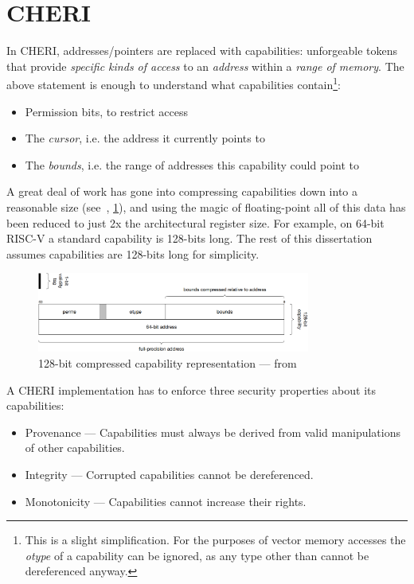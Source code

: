 \section{CHERI}\label{chap:bg:sec:cheri}
In CHERI, addresses/pointers are replaced with capabilities: unforgeable tokens that provide \emph{specific kinds of access} to an \emph{address} within a \emph{range of memory}.
The above statement is enough to understand what capabilities contain\footnote{This is a slight simplification. For the purposes of vector memory accesses the \emph{otype} of a capability can be ignored, as any type other than  cannot be dereferenced anyway.}:
\begin{itemize}
    \item Permission bits, to restrict access
    \item The \emph{cursor}, i.e. the address it currently points to
    \item The \emph{bounds}, i.e. the range of addresses this capability could point to
\end{itemize}
A great deal of work has gone into compressing capabilities down into a reasonable size (see~\cite{woodruffCHERIConcentratePractical2019}, \cref{cheri:compressedcap}), and using the magic of floating-point all of this data has been reduced to just 2x the architectural register size.
For example, on 64-bit RISC-V a standard capability is 128-bits long.
The rest of this dissertation assumes capabilities are 128-bits long for simplicity.

\begin{figure}[b]
    \centering
    \includegraphics[width=0.8\textwidth]{./figures/cheri_compressed_cap.png}
    \caption{128-bit compressed capability representation --- from~\cite{TR-941}}\label{cheri:compressedcap}
\end{figure}

A CHERI implementation has to enforce three security properties about its capabilities\cite[Section~1.2.1]{TR-951}:
\begin{itemize}
    \item Provenance --- Capabilities must always be derived from valid manipulations of other capabilities.
    \item Integrity --- Corrupted capabilities cannot be dereferenced.
    \item Monotonicity --- Capabilities cannot increase their rights.
\end{itemize}


